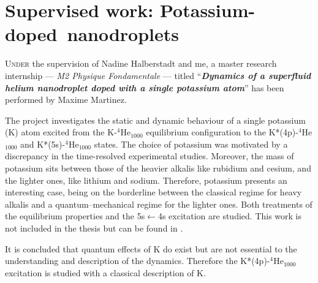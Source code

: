 \chapter{Supervised work: \mbox{Potassium-doped nanodroplets}}
	\lettrine[lines=4]{\color{activeColor}U}{nder} the supervision of Nadine Halberstadt and me, a master research internship --- \emph{M2 Physique Fondamentale} --- titled ``\emph{\textbf{Dynamics of a superfluid helium nanodroplet doped with a single potassium atom}}'' has been performed by Maxime Martinez.

	The project investigates the static and dynamic behaviour of a single potassium (K) atom excited from the K-$^4$He$_{1000}$ equilibrium configuration to the K*(4p)-$^4$He$_{1000}$ and K*(5s)-$^4$He$_{1000}$ states. The choice of potassium was motivated by a discrepancy in the time-resolved experimental studies\citep{Schulz2001,Reho2000-1,Reho2000-2}. Moreover, the mass of potassium sits between those of the heavier alkalis like rubidium and cesium, and the lighter ones, like lithium and sodium. Therefore, potassium presents an interesting case, being on the borderline between the classical regime for heavy alkalis and a quantum--mechanical regime for the lighter ones. Both treatments of the equilibrium properties and the 5s$\leftarrow$4s excitation are studied. This work is not included in the thesis but can be found in .
	
	It is concluded that quantum effects of K do exist but are not essential to the understanding and description of the dynamics. Therefore the K*(4p)-$^4$He$_{1000}$ excitation is studied with a classical description of K.
\clearpage{\pagestyle{empty}\cleardoublepage}